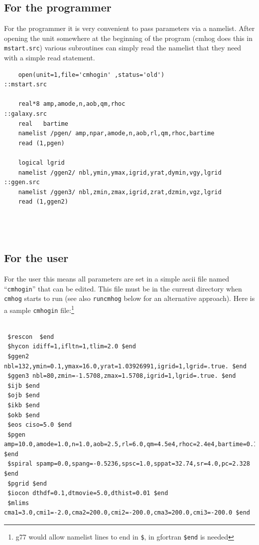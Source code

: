 \documentclass[10pt,dvips]{article}
\begin{document}
\subsection{For the programmer}

For the programmer it is very convenient to pass parameters via a namelist.
After opening the unit somewhere at the beginning of the program
(cmhog does this in {\tt mstart.src}) various subroutines can simply read
the namelist  that they need with a simple read statement.

\begin{verbatim}
    open(unit=1,file='cmhogin' ,status='old')                    ::mstart.src

    real*8 amp,amode,n,aob,qm,rhoc                               ::galaxy.src
    real   bartime
    namelist /pgen/ amp,npar,amode,n,aob,rl,qm,rhoc,bartime       
    read (1,pgen)                                                 

    logical lgrid
    namelist /ggen2/ nbl,ymin,ymax,igrid,yrat,dymin,vgy,lgrid    ::ggen.src
    namelist /ggen3/ nbl,zmin,zmax,igrid,zrat,dzmin,vgz,lgrid
    read (1,ggen2)




\end{verbatim}

\subsection{For the user}

For the user this means all parameters are set in a simple ascii file
named ``{\tt cmhogin}'' that can be edited. This file must be in the
current directory when {\tt cmhog} starts to run (see also
{\tt runcmhog} below for an alternative approach). Here is a sample
{\tt cmhogin} file:\footnote{g77 would allow namelist 
lines to end in {\tt \$},
in gfortran {\tt \$end} is needed}

\begin{verbatim}

 $rescon  $end
 $hycon idiff=1,ifltn=1,tlim=2.0 $end
 $ggen2 nbl=132,ymin=0.1,ymax=16.0,yrat=1.03926991,igrid=1,lgrid=.true. $end
 $ggen3 nbl=80,zmin=-1.5708,zmax=1.5708,igrid=1,lgrid=.true. $end
 $ijb $end
 $ojb $end
 $ikb $end
 $okb $end
 $eos ciso=5.0 $end
 $pgen amp=10.0,amode=1.0,n=1.0,aob=2.5,rl=6.0,qm=4.5e4,rhoc=2.4e4,bartime=0.1 $end
 $spiral spamp=0.0,spang=-0.5236,spsc=1.0,sppat=32.74,sr=4.0,pc=2.328 $end
 $pgrid $end
 $iocon dthdf=0.1,dtmovie=5.0,dthist=0.01 $end
 $mlims cma1=3.0,cmi1=-2.0,cma2=200.0,cmi2=-200.0,cma3=200.0,cmi3=-200.0 $end

\end{verbatim}
\end{document}
